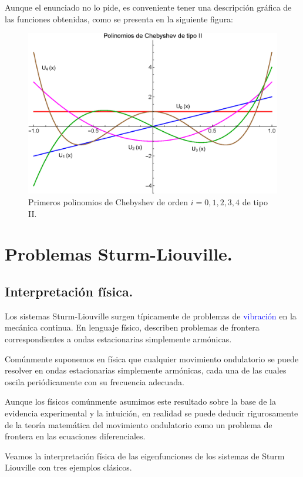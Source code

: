 Aunque el enunciado no lo pide, es conveniente tener una descripción gráfica de las funciones obtenidas, como se presenta en la siguiente figura:
\begin{figure}[H]
    \centering
    \includegraphics[scale=0.62]{Imagenes/Gram_Schmidt_Chebyshev_2.eps}
    \caption{Primeros polinomios de Chebyshev de orden $i = 0, 1, 2, 3, 4$ de tipo II.}
    \label{fig:figura_01}
\end{figure}

\section{Problemas Sturm-Liouville.}
\subsection{Interpretación física.}

Los sistemas Sturm-Liouville surgen típicamente de problemas de \textcolor{blue}{vibración} en la mecánica continua. En lenguaje físico, describen problemas de frontera correspondientes a ondas estacionarias simplemente armónicas.
\par
Comúnmente suponemos en física que cualquier movimiento ondulatorio se puede resolver en ondas estacionarias simplemente armónicas, cada una de las cuales oscila periódicamente con su frecuencia adecuada.
\par
Aunque los físicos comúnmente asumimos este resultado sobre la base de la evidencia experimental y la intuición,  en realidad se puede deducir rigurosamente de la teoría matemática del movimiento ondulatorio como un problema de frontera en las ecuaciones diferenciales.
\par
Veamos la interpretación física de las eigenfunciones de los sistemas de Sturm Liouville con tres ejemplos clásicos.

